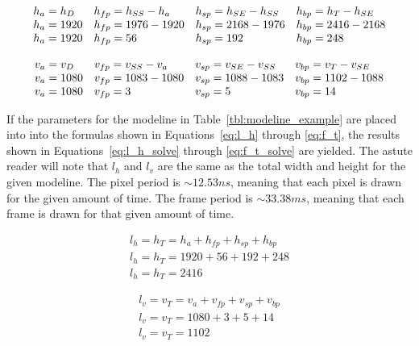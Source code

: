     \begin{equation}
        \begin{array}{ l l l l }
            \displaystyle
            h_a=h_D & h_{fp}=h_{SS}-h_a & h_{sp}=h_{SE}-h_{SS} & h_{bp}=h_T-h_{SE} \\
            h_a=1920 & h_{fp}=1976-1920 & h_{sp}=2168-1976 & h_{bp}=2416-2168 \\
            h_a=1920 & h_{fp}=56 & h_{sp}=192 & h_{bp}=248
        \end{array}
        \label{eq:h_a_solve}
    \end{equation}

    \begin{equation}
        \begin{array}{ l l l l }
            \displaystyle
            v_a=v_D & v_{fp}=v_{SS}-v_a & v_{sp}=v_{SE}-v_{SS} & v_{bp}=v_T-v_{SE} \\
            v_a=1080 & v_{fp}=1083-1080 & v_{sp}=1088-1083 & v_{bp}=1102-1088 \\
            v_a=1080 & v_{fp}=3 & v_{sp}=5 & v_{bp}=14
        \end{array}
        \label{eq:v_a_solve}
    \end{equation}

    If the parameters for the modeline in Table~\ref{tbl:modeline_example} are placed into into the formulas shown in Equations~\eqref{eq:l_h} through \eqref{eq:f_t}, the results shown in Equations~\eqref{eq:l_h_solve} through \eqref{eq:f_t_solve} are yielded. The astute reader will note that $l_h$ and $l_v$ are the same as the total width and height for the given modeline. The pixel period is $\sim12.53 ns$, meaning that each pixel is drawn for the given amount of time. The frame period is $\sim33.38 ms$, meaning that each frame is drawn for that given amount of time.

    \begin{equation}
        \begin{array}{ l }
            \displaystyle l_h=h_T=h_a+h_{fp}+h_{sp}+h_{bp} \\
            \displaystyle l_h=h_T=1920+56+192+248 \\
            \displaystyle l_h=h_T=2416
            \label{eq:l_h_solve}
        \end{array}
    \end{equation}

    \begin{equation}
        \begin{array}{ l }
            \displaystyle l_v=v_T=v_a+v_{fp}+v_{sp}+v_{bp} \\
            \displaystyle l_v=v_T=1080+3+5+14 \\
            \displaystyle l_v=v_T=1102 \\[11pt]
        \end{array}
        \label{eq:l_v_solve}
    \end{equation}


